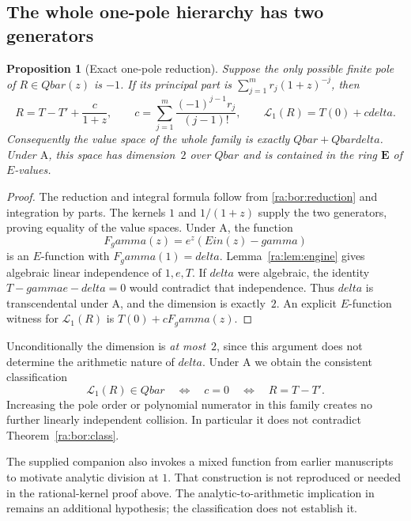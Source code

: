 \documentclass[11pt,a4paper]{article}
\newcommand{\QB}{\overline{\mathbb Q}}
\newcommand{\Qbar}{\overline{\mathbb Q}}
\DeclareMathOperator{\Ein}{Ein}
\newtheorem{proposition}[theorem]{Proposition}
\theoremstyle{definition}
\theoremstyle{remark}
\theoremstyle{plain}
\numberwithin{equation}{section}
\def\Ein{Ein}\def\gamma{gamma}\def\delta{delta}\def\eta{eta}%
\def\Qbar{Qbar}\def\QB{Qbar}\def\mathbb#1{#1}%
\begin{document}
\subsection{The whole one-pole hierarchy has two generators}
\begin{proposition}[Exact one-pole reduction]\label{ra:bor:onepole}
Suppose the only possible finite pole of $R\in\Qbar(z)$ is $-1$.
If its principal part is $\sum_{j=1}^m r_j(1+z)^{-j}$, then
\[
 R=T-T'+\frac{c}{1+z},\qquad
 c=\sum_{j=1}^m\frac{(-1)^{j-1}r_j}{(j-1)!},
 \qquad
 \mathcal L_1(R)=T(0)+c\delta.
\]
Consequently the value space of the whole family is exactly
$\Qbar+\Qbar\delta$.  Under $\mathrm A$, this space has dimension~$2$
over $\Qbar$ and is contained in the ring $\mathbf E$ of $E$-values.
\end{proposition}
\begin{proof}
The reduction and integral formula follow from
\eqref{ra:bor:reduction} and integration by parts.  The kernels $1$ and
$1/(1+z)$ supply the two generators, proving equality of the value spaces.
Under $\mathrm A$, the function
\[
 F_\gamma(z)=e^z(\Ein(z)-\gamma)
\]
is an $E$-function with $F_\gamma(1)=\delta$.  Lemma~\ref{ra:lem:engine} gives algebraic linear independence of $1,e,T$.
If $\delta$ were algebraic, the identity
$T-\gamma e-\delta=0$ would contradict that independence.  Thus $\delta$ is transcendental under $\mathrm A$, and
the dimension is exactly~$2$.  An explicit $E$-function witness for
$\mathcal L_1(R)$ is $T(0)+cF_\gamma(z)$.
\end{proof}
Unconditionally the dimension is \emph{at most}~$2$, since this argument
does not determine the arithmetic nature of $\delta$.
Under $\mathrm A$ we obtain the consistent classification
\[
 \mathcal L_1(R)\in\Qbar
 \quad\Longleftrightarrow\quad c=0
 \quad\Longleftrightarrow\quad R=T-T'.
\]
Increasing the pole order or polynomial numerator in this family creates
no further linearly independent collision.  In particular it does not
contradict Theorem~\ref{ra:bor:class}.

The supplied companion also invokes a mixed function from earlier
manuscripts to motivate analytic division at $1$. That construction is not
reproduced or needed in the rational-kernel proof above. The
analytic-to-arithmetic implication in \cite[Conjecture~3]{FRmixed}
remains an additional hypothesis; the classification does not establish it.
\end{document}
